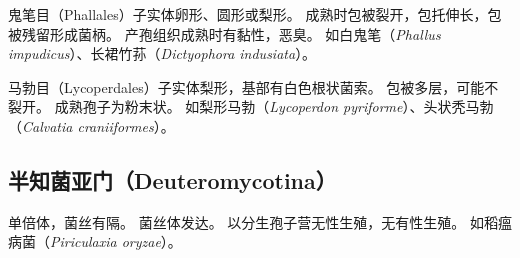 \documentclass[11pt]{article}
\begin{document}
\newline

鬼笔目（Phallales）子实体卵形、圆形或梨形。
成熟时包被裂开，包托伸长，包被残留形成菌柄。
产孢组织成熟时有黏性，恶臭。
如白鬼笔（\textit{Phallus impudicus}）、长裙竹荪（\textit{Dictyophora indusiata}）。

\newline

马勃目（Lycoperdales）子实体梨形，基部有白色根状菌索。
包被多层，可能不裂开。
成熟孢子为粉末状。
如梨形马勃（\textit{Lycoperdon pyriforme}）、头状秃马勃（\textit{Calvatia craniiformes}）。

\subsection{半知菌亚门（Deuteromycotina）}
单倍体，菌丝有隔。
菌丝体发达。
以分生孢子营无性生殖，无有性生殖。
如稻瘟病菌（\textit{Piriculaxia oryzae}）。
\end{document}
